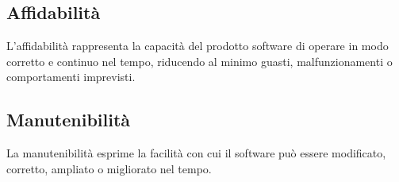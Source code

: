 \subsection{Affidabilità}
L’affidabilità rappresenta la capacità del prodotto software di operare in modo corretto e continuo nel tempo, riducendo al minimo guasti, malfunzionamenti o comportamenti imprevisti.
\begin{table}[h]
    \centering
    \renewcommand{\arraystretch}{1.15}
    \vspace{-0.3cm}
    \caption{Affidabilità del prodotto}
\end{table}

\subsection{Manutenibilità}
La manutenibilità esprime la facilità con cui il software può essere modificato, corretto, ampliato o migliorato nel tempo.
\begin{table}[h]
    \centering
    \renewcommand{\arraystretch}{1.15}
    \vspace{-0.3cm}
    \caption{Manutenibilità del prodotto}
\end{table}